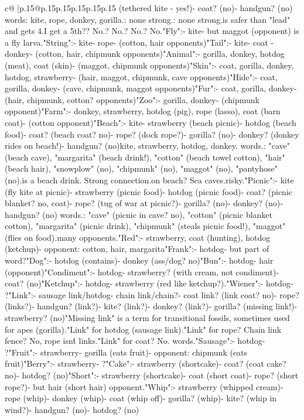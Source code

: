 \documentclass{article}
\begin{document}
{\begin{supertabular}{c@{$\;$}|p{.15\linewidth}@{}p{.15\linewidth}p{.15\linewidth}p{.15\linewidth}p{.15\linewidth}p{.15\linewidth}}
{{{(tethered kite - yes!)\n- coat? (no)\n- handgun? (no) words: kite, rope, donkey, gorilla.\nOpponents: none strong.\nDistractors: none strong.\nThis is safer than "lead" and gets 4.\nCan I get a 5th?\nCoat? No.\nHandgun? No.\nStrawberry? No.\nHotdog? No.\n\n"Fly":\n- kite\n- but maggot (opponent) is a fly larva.\n\n"String":\n- kite\n- rope\n- (cotton, hair opponents)\n\n"Tail":\n- kite\n- coat  \n- donkey\n- (cotton, hair, chipmunk opponents)\n\n"Animal":\n- gorilla, donkey, hotdog (meat), coat (skin)\n- (maggot, chipmunk opponents)\n\n"Skin":\n- coat, gorilla, donkey, hotdog, strawberry\n- (hair, maggot, chipmunk, cave opponents)\n\n"Hide":\n- coat, gorilla, donkey\n- (cave, chipmunk, maggot opponents)\n\n"Fur":\n- coat, gorilla, donkey\n- (hair, chipmunk, cotton? opponents)\n\n"Zoo":\n- gorilla, donkey\n- (chipmunk opponent)\n\n"Farm":\n- donkey, strawberry, hotdog (pig), rope (lasso), coat (barn coat)\n- (cotton opponent)\n\n"Beach":\n- kite\n- strawberry (beach picnic)\n- hotdog (beach food)\n- coat? (beach coat? no)\n- rope? (dock rope?)\n- gorilla? (no)\n- donkey? (donkey rides on beach!)\n- handgun? (no)\nSo kite, strawberry, hotdog, donkey. words.\nOpponents: "cave" (beach cave), "margarita" (beach drink!), "cotton" (beach towel cotton), "hair" (beach hair), "snowplow" (no), "chipmunk" (no), "maggot" (no), "pantyhose" (no).\nMargarita is a beach drink. Strong connection.\nCave on beach? Sea caves.\nSo risky.\n\n"Picnic":\n- kite (fly kite at picnic)\n- strawberry (picnic food)\n- hotdog (picnic food)\n- coat? (picnic blanket? no, coat)\n- rope? (tug of war at picnic?)\n- gorilla? (no)\n- donkey? (no)\n- handgun? (no) words.\nOpponents: "cave" (picnic in cave? no), "cotton" (picnic blanket cotton), "margarita" (picnic drink), "chipmunk" (steals picnic food!), "maggot" (flies on food).\nToo many opponents.\n\n"Red":\n- strawberry, coat (hunting), hotdog (ketchup)\n- opponent: cotton, hair, margarita\n\n"Frank":\n- hotdog\n- but part of word?\n\n"Dog":\n- hotdog (contains)\n- donkey (ass/dog? no)\n\n"Bun":\n- hotdog\n- hair (opponent)\n\n"Condiment":\n- hotdog\n- strawberry? (with cream, not condiment)\n- coat? (no)\n\n"Ketchup":\n- hotdog\n- strawberry (red like ketchup?)\nWeak.\n\n"Wiener":\n- hotdog\n- ?\n\n"Link":\n- sausage link/hotdog\n- chain link/chain?\n- coat link? (link coat? no)\n- rope? (links?)\n- handgun? (link?)\n- kite? (link?)\n- donkey? (link?)\n- gorilla? (missing link!)\n- strawberry? (no)\n"Missing link" is a term for transitional fossils, sometimes used for apes (gorilla).\n"Link" for hotdog (sausage link).\n"Link" for rope? Chain link fence? No, rope isn\'t links.\n"Link" for coat? No. words.\n\n"Sausage":\n- hotdog\n- ?\n\n"Fruit":\n- strawberry\n- gorilla (eats fruit)\n- opponent: chipmunk (eats fruit)\n\n"Berry":\n- strawberry\n- ?\n\n"Cake":\n- strawberry (shortcake)\n- coat? (coat cake? no)\n- hotdog? (no)\n\n"Short":\n- strawberry (shortcake)\n- coat (short coat)\n- rope? (short rope?)\n- but hair (short hair) opponent.\n\n"Whip":\n- strawberry (whipped cream)\n- rope (whip)\n- donkey (whip)\n- coat (whip off)\n- gorilla? (whip)\n- kite? (whip in wind?)\n- handgun? (no)\n- hotdog? (no) }}}
\end{supertabular}}
\end{document}
